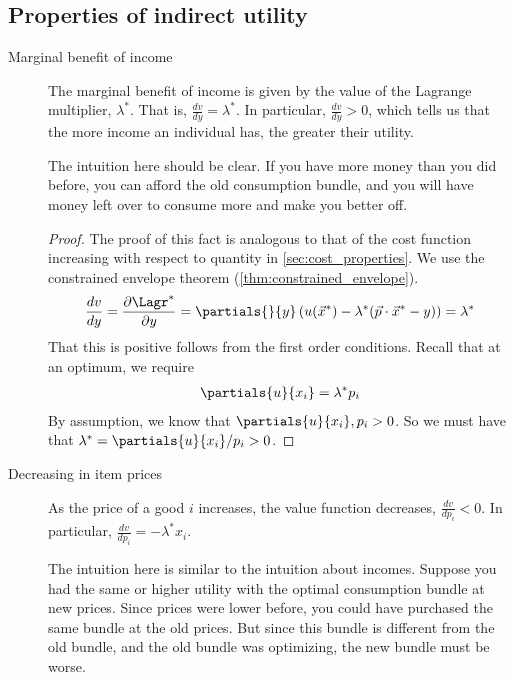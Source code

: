 \subsection*{Properties of indirect utility}
\begin{description}
    \item[Marginal benefit of income] The marginal benefit of income is given by the value of the Lagrange multiplier, $\lambda^*$. That is, $\frac{dv}{dy} = \lambda^*$. In particular, $\frac{dv}{dy} > 0$, which tells us that the more income an individual has, the greater their utility.
    
    The intuition here should be clear. If you have more money than you did before, you can afford the old consumption bundle, and you will have money left over to consume more and make you better off.

    \begin{proof}
        The proof of this fact is analogous to that of the cost function increasing with respect to quantity in \ref{sec:cost_properties}. We use the constrained envelope theorem (\ref{thm:constrained_envelope}).
        \begin{align*}
            \frac{dv}{dy} = \frac{\partial\Lagr^*}{\partial y} = \partials{}{y} \left(u(\vec{x}^*) - \lambda^* (\vec{p} \cdot \vec{x}^* - y)\right) = \lambda^*
        \end{align*}
        That this is positive follows from the first order conditions. Recall that at an optimum, we require 
        \begin{align*}
            \partials{u}{x_i} = \lambda^* p_i
        \end{align*}
        By assumption, we know that $\partials{u}{x_i}, p_i > 0$. So we must have that $\lambda^* = \partials{u}{x_i} / p_i > 0$.
    \end{proof}

    \item[Decreasing in item prices] As the price of a good $i$ increases, the value function decreases, $\frac{dv}{dp_i} < 0$. In particular, $\frac{dv}{dp_i} = - \lambda^* x_i$. 
    
    The intuition here is similar to the intuition about incomes. Suppose you had the same or higher utility with the optimal consumption bundle at new prices. Since prices were lower before, you could have purchased the same bundle at the old prices. But since this bundle is different from the old bundle, and the old bundle was optimizing, the new bundle must be worse.


\end{description}
